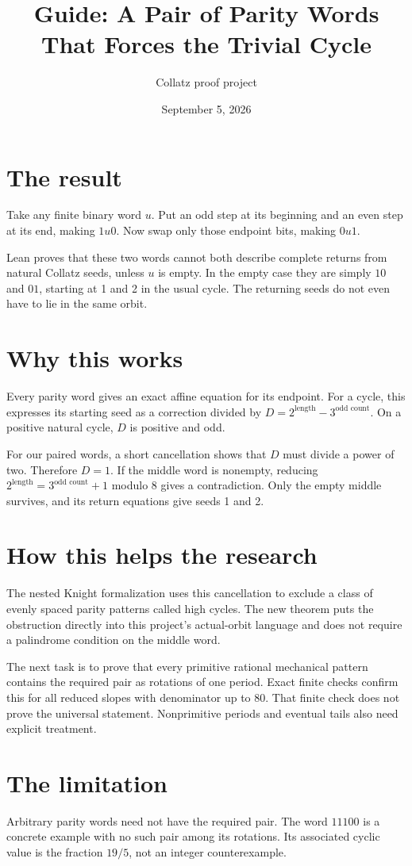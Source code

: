 \documentclass[10pt]{article}
\title{Guide: A Pair of Parity Words That Forces the Trivial Cycle}
\author{Collatz proof project}
\date{September 5, 2026}
\begin{document}
\maketitle
\section*{The result}
Take any finite binary word $u$. Put an odd step at its beginning and an
even step at its end, making $1u0$. Now swap only those endpoint bits,
making $0u1$.

Lean proves that these two words cannot both describe complete returns
from natural Collatz seeds, unless $u$ is empty. In the empty case they
are simply $10$ and $01$, starting at 1 and 2 in the usual cycle.
The returning seeds do not even have to lie in the same orbit.

\section*{Why this works}
Every parity word gives an exact affine equation for its endpoint.
For a cycle, this expresses its starting seed as a correction divided by
$D=2^{\text{length}}-3^{\text{odd count}}$. On a positive natural cycle,
$D$ is positive and odd.

For our paired words, a short cancellation shows that $D$ must divide a
power of two. Therefore $D=1$. If the middle word is nonempty, reducing
$2^{\text{length}}=3^{\text{odd count}}+1$ modulo 8 gives a contradiction.
Only the empty middle survives, and its return equations give seeds 1 and 2.

\section*{How this helps the research}
The nested Knight formalization uses this cancellation to exclude a class
of evenly spaced parity patterns called high cycles. The new theorem puts
the obstruction directly into this project's actual-orbit language and
does not require a palindrome condition on the middle word.

The next task is to prove that every primitive rational mechanical pattern
contains the required pair as rotations of one period. Exact finite checks
confirm this for all reduced slopes with denominator up to 80. That finite
check does not prove the universal statement. Nonprimitive periods and
eventual tails also need explicit treatment.

\section*{The limitation}
Arbitrary parity words need not have the required pair. The word $11100$
is a concrete example with no such pair among its rotations. Its associated
cyclic value is the fraction $19/5$, not an integer counterexample.
\end{document}
